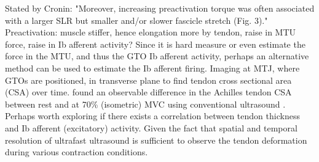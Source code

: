 Stated by Cronin: "Moreover, increasing preactivation torque was often associated with a larger SLR but smaller and/or slower fascicle stretch (Fig. 3)." Preactivation: muscle stiffer, hence elongation more by tendon, raise in MTU force, raise in Ib afferent activity? 
Since it is hard measure or even estimate the force in the MTU, and thus the GTO Ib afferent activity, perhaps an alternative method can be used to estimate the Ib afferent firing. %
Imaging at MTJ, where GTOs are positioned, in transverse plane to find tendon cross sectional area (CSA) over time.  \citeauthor{obst_three-dimensional_2014} found an observable difference in the Achilles tendon CSA between rest and at 70\% (isometric) MVC using conventional ultrasound \cite{obst_three-dimensional_2014}. Perhaps worth exploring if there exists a correlation between tendon thickness and Ib afferent (excitatory) activity. Given the fact that spatial and temporal resolution of ultrafast ultrasound is sufficient to observe the tendon deformation during various contraction conditions. 



